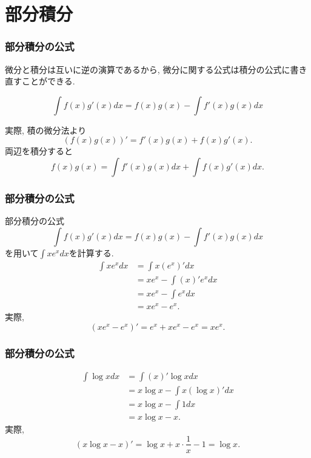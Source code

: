 

\section{部分積分}

\begin{frame}
\frametitle{部分積分の公式}

微分と積分は互いに逆の演算であるから, 微分に関する公式は積分の公式に書き直すことができる. 

\begin{Thm}[部分積分の公式]
$$
\int f(x)g'(x)dx = f(x)g(x) - \int f'(x)g(x)dx
$$
\end{Thm}

実際, 積の微分法より
$$
(f(x)g(x))'=f'(x)g(x)+f(x)g'(x). 
$$
両辺を積分すると
$$
f(x)g(x)=\int f'(x)g(x)dx +\int f(x)g'(x)dx.
$$


\end{frame}





\begin{frame}
\frametitle{部分積分の公式}

部分積分の公式
$$
\int f(x)g'(x)dx = f(x)g(x) - \int f'(x)g(x)dx
$$
を用いて$\int x e^x dx$を計算する. 
\begin{align*}
\int x e^x dx &= \int x(e^x)'dx \\
& = xe^x-\int(x)'e^xdx \\
&= xe^x-\int e^xdx \\
& = xe^x - e^x. 
\end{align*}
実際, 
$$
(xe^x - e^x)'=e^x+xe^x-e^x=xe^x. 
$$

\end{frame}







\begin{frame}
\frametitle{部分積分の公式}

\begin{align*}
\int \log x dx & = \int (x)'\log x dx \\
& = x \log x -\int x(\log x)'dx \\
&= x \log x - \int 1 dx \\
& = x\log x -x.  
\end{align*}
実際, 
$$
(x\log x -x)' = \log x + x \cdot \frac{1}{x}-1=\log x. 
$$


\end{frame}


